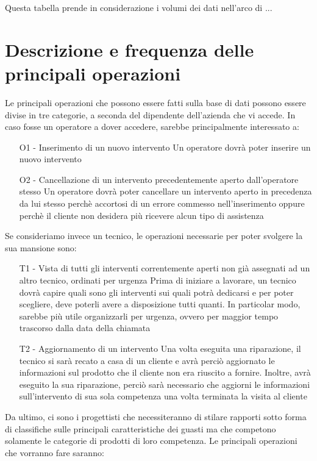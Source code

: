 \documentclass[a4paper, 12pt]{report}
\begin{document}
Questa tabella prende in considerazione i volumi dei dati nell'arco di ...

\section{Descrizione e frequenza delle principali operazioni}

Le principali operazioni che possono essere fatti sulla base di dati possono essere divise in tre categorie, a seconda del dipendente dell'azienda che vi accede.
In caso fosse un operatore a dover accedere, sarebbe principalmente interessato a:

\begin{itemize}
	\item[O1 -] Inserimento di un nuovo intervento
		\subitem Un operatore dovrà poter inserire un nuovo intervento 
	\item[O2 -] Cancellazione di un intervento precedentemente aperto dall'operatore stesso
		\subitem Un operatore dovrà poter cancellare un intervento aperto in precedenza da lui stesso perchè accortosi di un errore commesso nell'inserimento
		oppure perchè il cliente non desidera più ricevere alcun tipo di assistenza 
\end{itemize}

Se consideriamo invece un tecnico, le operazioni necessarie per poter svolgere la sua mansione sono:

\begin{itemize}
	\item[T1 - ] Vista di tutti gli interventi correntemente aperti non già assegnati ad un altro tecnico, ordinati per urgenza
		\subitem Prima di iniziare a lavorare, un tecnico dovrà capire quali sono gli interventi sui quali potrà dedicarsi e per poter scegliere, deve poterli avere a
		disposizione tutti quanti. In particolar modo, sarebbe più utile organizzarli per urgenza, ovvero per maggior tempo trascorso dalla data della chiamata
	\item[T2 - ] Aggiornamento di un intervento
		\subitem Una volta eseguita una riparazione, il tecnico si sarà recato a casa di un cliente e avrà perciò aggiornato le informazioni sul prodotto che il cliente
		non era riuscito a fornire. Inoltre, avrà eseguito la sua riparazione, perciò sarà necessario che aggiorni le informazioni sull'intervento di sua sola
		competenza una volta terminata la visita al cliente
\end{itemize}

Da ultimo, ci sono i progettisti che necessiteranno di stilare rapporti sotto forma di classifiche sulle principali caratteristiche dei guasti ma che competono solamente
le categorie di prodotti di loro competenza. Le principali operazioni che vorranno fare saranno:
\end{document}
